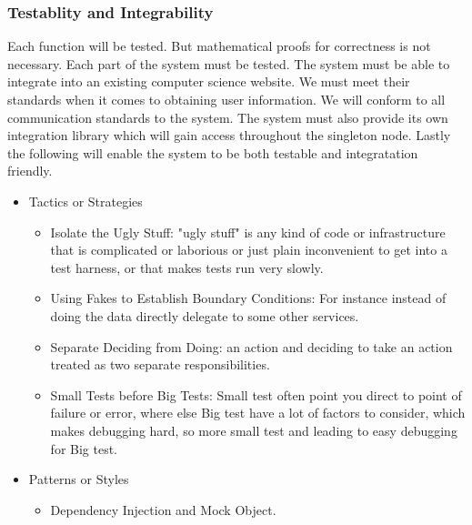 \subsubsection{Testablity and Integrability}
		Each function will be tested. But mathematical proofs for correctness is not necessary. Each part of the system must be tested. The system must be able to integrate into an existing computer science website. We must meet their standards when it comes to obtaining user information. We will conform to all communication standards to the system. The system must also provide its own integration library which will gain access throughout the singleton node. Lastly the following will enable the system to be both testable and integratation friendly.
		\begin{itemize}
	\item{Tactics or Strategies}
		\begin{itemize}
			\item Isolate the Ugly Stuff: "ugly stuff" is any kind of code or infrastructure that is complicated or laborious or just plain inconvenient to get into a test harness, or that makes tests run very slowly.
			\item Using Fakes to Establish Boundary Conditions: For instance instead of doing the data directly delegate to some other services.
			\item Separate Deciding from Doing: an action and deciding to take an action treated as two separate responsibilities.
			\item Small Tests before Big Tests: Small test often point you direct to point of failure or error, where else Big test have a lot of factors to consider, which makes debugging hard, so more small test and leading to easy debugging for Big test.
		\end{itemize}
	\item{Patterns or Styles}
		\begin{itemize}
			\item Dependency Injection and Mock Object.
		\end{itemize}
\end{itemize}

